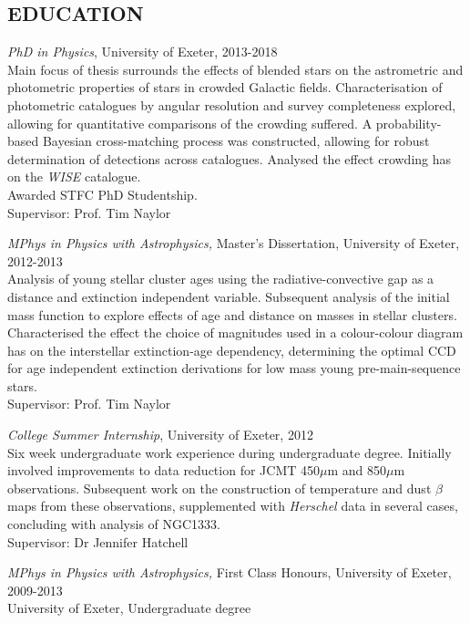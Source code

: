 \documentclass[letter, margin, 10pt]{res} %
\begin{document}
\begin{resume}
\section{EDUCATION}

{\sl PhD in Physics}, University of Exeter, 2013-2018\\
Main focus of thesis surrounds the effects of blended stars on the astrometric and photometric properties of stars in crowded Galactic fields. Characterisation of photometric catalogues by angular resolution and survey completeness explored, allowing for quantitative comparisons of the crowding suffered. A probability-based Bayesian cross-matching process was constructed, allowing for robust determination of detections across catalogues. Analysed the effect crowding has on the \textit{WISE} catalogue. \\Awarded STFC PhD Studentship. \\Supervisor: Prof. Tim Naylor

{\sl MPhys in Physics with Astrophysics,} Master's Dissertation, University of Exeter, 2012-2013 \\
Analysis of young stellar cluster ages using the radiative-convective gap as a distance and extinction independent variable. Subsequent analysis of the initial mass function to explore effects of age and distance on masses in stellar clusters. Characterised the effect the choice of magnitudes used in a colour-colour diagram has on the interstellar extinction-age dependency, determining the optimal CCD for age independent extinction derivations for low mass young pre-main-sequence stars. \\Supervisor: Prof. Tim Naylor

{\sl College Summer Internship}, University of Exeter, 2012\\
Six week undergraduate work experience during undergraduate degree. Initially involved improvements to data reduction for JCMT 450$\mu$m and 850$\mu$m observations. Subsequent work on the construction of temperature and dust $\beta$ maps from these observations, supplemented with \textit{Herschel} data in several cases, concluding with analysis of NGC1333.\\Supervisor: Dr Jennifer Hatchell

{\sl MPhys in Physics with Astrophysics,} First Class Honours, University of Exeter, 2009-2013 \\
University of Exeter, Undergraduate degree

\parskip 5pt

\end{resume}
\end{document}
